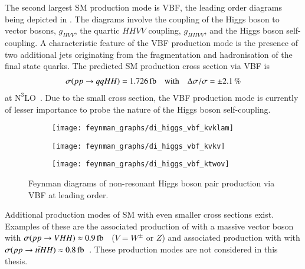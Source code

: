 The second largest SM \HH production mode is VBF, the leading order diagrams
being depicted in . The diagrams involve the coupling
of the Higgs boson to vector bosons, $g_{HVV}$, the quartic $HHVV$ coupling,
$g_{HHVV}$, and the Higgs boson self-coupling. A characteristic feature of the
VBF production mode is the presence of two additional jets originating from the
fragmentation and hadronisation of the final state quarks. The predicted SM \HH
production cross section via VBF is
\begin{align*}
  \sigma(\pp \to qqHH) = \SI{1.726}{\femto\barn}
  \quad \text{with} \quad
  \Delta \sigma / \sigma = \pm 2.1\,\%
\end{align*}
at $\text{N}^3\text{LO}$~\cite{Dreyer:2018qbw,LHCHWGHH}. Due to the small
cross section, the VBF production mode is currently of lesser importance to
probe the nature of the Higgs boson self-coupling.

\begin{figure}[htbp]
  \centering

  \begin{subfigure}{0.33\textwidth}
    \centering
    \texttt{[image: feynman\_graphs/di\_higgs\_vbf\_kvklam]}
    \subcaption{}
  \end{subfigure}\hfill%
  \begin{subfigure}{0.33\textwidth}
    \centering
    \texttt{[image: feynman\_graphs/di\_higgs\_vbf\_kvkv]}
    \subcaption{}
  \end{subfigure}\hfill%
  \begin{subfigure}{0.33\textwidth}
    \centering
    \texttt{[image: feynman\_graphs/di\_higgs\_vbf\_ktwov]}
    \subcaption{}
  \end{subfigure}

  \caption[Feynman diagrams of non-resonant Higgs boson pair production via
  VBF.]{Feynman diagrams of non-resonant Higgs boson pair production via VBF at
    leading order.}%
  \label{fig:dihiggs_vbf_feyn}
\end{figure}

Additional production modes of SM \HH with even smaller cross sections
exist. Examples of these are the associated production of \HH with a massive
vector boson with
$\sigma(\pp \to VHH) \approx \SI{0.9}{\femto\barn}$~\cite{deFlorian:2016spz_book}
($V = W^\pm$ or $Z$) and associated production with \ttbar with
$\sigma(\pp \to \ttbar HH) \approx
\SI{0.8}{\femto\barn}$~\cite{deFlorian:2016spz_book}. These production modes are not
considered in this thesis.



